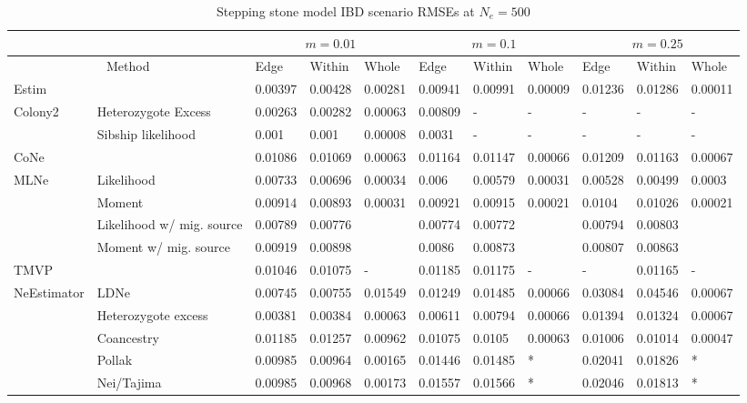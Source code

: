 \begin{landscape}
\begin{table}[h]
\centering \small
\caption[Stepping stone model IBD scenario RMSEs at $N_e = 500$]{Stepping stone model IBD scenario RMSEs at $N_e = 500$}
\label{tab:ne5}
\begin{tabular}{ | l| p{2cm}|| l| l| l|| l| l| l|| l| l| l| }
\hline
\multicolumn{2}{c}{ }   & \multicolumn{3}{c}{$m = 0.01$}  & \multicolumn{3}{c}{$m = 0.1$} & \multicolumn{3}{c}{$m = 0.25$}  \\ \hline
\multicolumn{2}{c}{Method} & Edge & Within & Whole & Edge & Within & Whole & Edge & Within & Whole \\ \hline
Estim & & 0.00397 & 0.00428 & 0.00281 & 0.00941 & 0.00991 & 0.00009 & 0.01236 & 0.01286 & 0.00011 \\ \hline
Colony2 & Heterozygote Excess & 0.00263 & 0.00282 & 0.00063 & 0.00809 & - & - & - & - & - \\ \hline
 & Sibship likelihood & 0.001 & 0.001 & 0.00008 & 0.0031 & - & - & - & - & - \\ \hline
CoNe &  & 0.01086 & 0.01069 & 0.00063 & 0.01164 & 0.01147 & 0.00066 & 0.01209 & 0.01163 & 0.00067 \\ \hline
MLNe  & Likelihood & 0.00733 & 0.00696 & 0.00034 & 0.006 & 0.00579 & 0.00031 & 0.00528 & 0.00499 & 0.0003 \\ \hline
 & Moment  & 0.00914 & 0.00893 & 0.00031 & 0.00921 & 0.00915 & 0.00021 & 0.0104 & 0.01026 & 0.00021 \\ \hline
 & Likelihood w/ mig. source & 0.00789 & 0.00776 &  & 0.00774 & 0.00772 &  & 0.00794 & 0.00803 &  \\ \hline
 & Moment w/ mig. source & 0.00919 & 0.00898 &  & 0.0086 & 0.00873 &  & 0.00807 & 0.00863 &  \\ \hline
TMVP &  & 0.01046 & 0.01075 & - & 0.01185 & 0.01175 & - & - & 0.01165 & - \\ \hline
NeEstimator & LDNe & 0.00745 & 0.00755 & 0.01549 & 0.01249 & 0.01485 & 0.00066 & 0.03084 & 0.04546 & 0.00067 \\ \hline
 & Heterozygote excess & 0.00381 & 0.00384 & 0.00063 & 0.00611 & 0.00794 & 0.00066 & 0.01394 & 0.01324 & 0.00067 \\ \hline
 & Coancestry & 0.01185 & 0.01257 & 0.00962 & 0.01075 & 0.0105 & 0.00063 & 0.01006 & 0.01014 & 0.00047 \\ \hline
 & Pollak & 0.00985 & 0.00964 & 0.00165 & 0.01446 & 0.01485 & * & 0.02041 & 0.01826 & * \\ \hline
 & Nei/Tajima & 0.00985 & 0.00968 & 0.00173 & 0.01557 & 0.01566 & * & 0.02046 & 0.01813 & * \\ \hline

\end{tabular}
\end{table}
\end{landscape}
